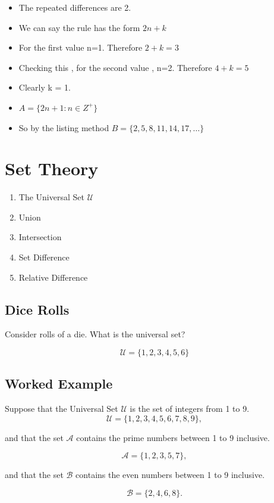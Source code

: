 \documentclass{article}
\begin{document}
\begin{itemize}
	\item The repeated differences are 2.
	\item We can say the rule has the form $2n+k$
	\item For the first value n=1. Therefore $2+k=3$
	\item Checking this , for the second value , n=2. Therefore $4+k=5$
	\item Clearly k = 1.
	\item $A = \{2n+1 :n \in Z^{+} \}$
	\item So by the listing method $B= \{2,5,8,11,14,17,\ldots\}$
\end{itemize}

\section{Set Theory}
\begin{enumerate}
	\item The Universal Set $\mathcal{U}$
	\item Union
	\item Intersection
	\item Set Difference
	\item Relative Difference
\end{enumerate}

\newpage
\subsection*{Dice Rolls}
Consider rolls of a die. What is the universal set?

\[ \mathcal{U} = \{1,2,3,4,5,6\} \]

\subsection*{Worked Example}

Suppose that the Universal Set $\mathcal{U}$ is the set of integers from 1 to 9.
\[ \mathcal{U} = \{1,2,3,4,5,6,7,8,9\}, \]

and that the set $\mathcal{A}$ contains the prime numbers between 1 to 9 inclusive.

\[ \mathcal{A} = \{1,2,3,5,7\}, \]

and that the set $\mathcal{B}$ contains the even numbers between 1 to 9 inclusive.

\[ \mathcal{B} = \{2,4,6,8\}. \]
\end{document}

